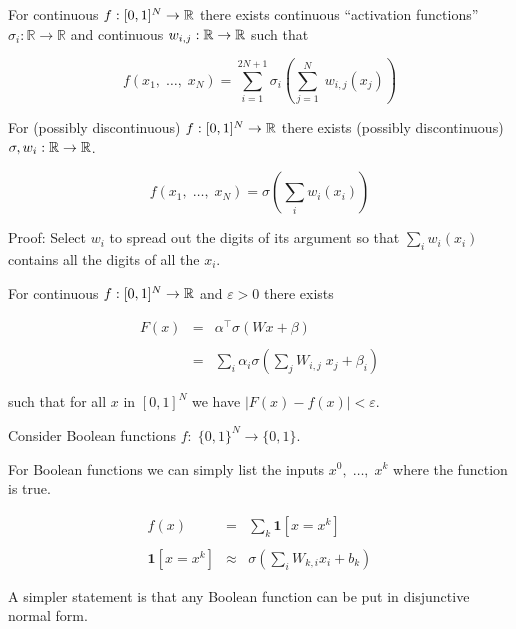 {For continuous $f: [0,1]^N \rightarrow \mathbb{R}$ there exists continuous
``activation functions'' $\sigma_i: \mathbb{R} \rightarrow \mathbb{R}$ and continuous $w_{i,j} : \mathbb{R} \rightarrow \mathbb{R}$ such that


\vfill
$$f(x_1,\;\ldots,\;x_N)=\sum _{{i=1}}^{{2N+1}} \sigma_i \left(\sum_{j=1}^N\;w_{i,j}(x_j)\right)$$




For (possibly discontinuous) $f: [0,1]^N \rightarrow \mathbb{R}$ there exists (possibly discontinuous)
$\sigma, w_i: \mathbb{R} \rightarrow \mathbb{R}$.

\vfill
$$f(x_1,\;\ldots,\;x_N) = \sigma\left(\sum_i w_i(x_i)\right)$$

\vfill
Proof: Select $w_i$ to spread out the digits of its argument so that $\sum_i w_i(x_i)$ contains all the digits of all the $x_i$.


For continuous $f: [0,1]^N \rightarrow \mathbb{R}$ and $\varepsilon >0$ there exists

\vfill
\begin{eqnarray*}
  F(x) &= & \alpha^\top \sigma(Wx + \beta) \\
  \\
  & = & \sum_i \alpha_i \sigma\left(\sum_j W_{i,j} \;x_j + \beta_i\right)
\end{eqnarray*}


\vfill
such that for all $x$ in $[0,1]^N$ we have $| F( x ) - f ( x ) | < \varepsilon$.


Consider Boolean functions $f:\;\{0,1\}^N \rightarrow \{0,1\}$.

\vfill
For Boolean functions we can simply list the inputs $x^0,\;\ldots,\;x^k$ where the function is true.

\begin{eqnarray*}
  f(x) & = & \sum_k \mathbf{1}[x=x^k] \\
  \\
  \mathbf{1}[x = x^k] & \approx & \sigma\left(\sum_i W_{k,i} x_i + b_k\right)
\end{eqnarray*}

\vfill
A simpler statement is that any Boolean function can be put in disjunctive normal form.


}
